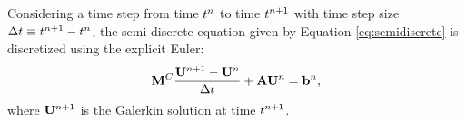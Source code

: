 Considering a time step from time $t^n$ to time
$t^{n+1}$ with time step size $\Delta t\equiv
t^{n+1}-t^n$, the semi-discrete equation
given by Equation \eqref{eq:semidiscrete} is discretized using the explicit
Euler:
\begin{equation}\label{eq:galerkin_FE}
   \mathbf{M}^C\frac{\mathbf{U}^{n+1}
   -\mathbf{U}^n}{\Delta t}
   +\mathbf{A}\mathbf{U}^n = \mathbf{b}^n,
\end{equation}
where $\mathbf{U}^{n+1}$ is the Galerkin solution at time
$t^{n+1}$.
